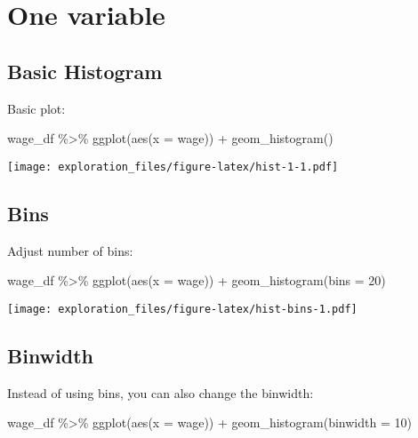 \documentclass[
]{book}
\newenvironment{Shaded}{\begin{snugshade}}{\end{snugshade}}
\newcommand{\AttributeTok}[1]{\textcolor[rgb]{0.77,0.63,0.00}{#1}}
\newcommand{\DecValTok}[1]{\textcolor[rgb]{0.00,0.00,0.81}{#1}}
\newcommand{\FunctionTok}[1]{\textcolor[rgb]{0.00,0.00,0.00}{#1}}
\newcommand{\NormalTok}[1]{#1}
\newcommand{\SpecialCharTok}[1]{\textcolor[rgb]{0.00,0.00,0.00}{#1}}
\begin{document}
\hypertarget{one-variable-1}{%
\section{One variable}\label{one-variable-1}}

\hypertarget{basic-histogram}{%
\subsection{Basic Histogram}\label{basic-histogram}}

Basic plot:

\begin{Shaded}
\begin{Highlighting}[]
\NormalTok{wage\_df }\SpecialCharTok{\%\textgreater{}\%} 
  \FunctionTok{ggplot}\NormalTok{(}\FunctionTok{aes}\NormalTok{(}\AttributeTok{x =}\NormalTok{ wage)) }\SpecialCharTok{+}
  \FunctionTok{geom\_histogram}\NormalTok{()}
\end{Highlighting}
\end{Shaded}

\texttt{[image: exploration\_files/figure-latex/hist-1-1.pdf]}

\hypertarget{bins}{%
\subsection{Bins}\label{bins}}

Adjust number of bins:

\begin{Shaded}
\begin{Highlighting}[]
\NormalTok{wage\_df }\SpecialCharTok{\%\textgreater{}\%} 
  \FunctionTok{ggplot}\NormalTok{(}\FunctionTok{aes}\NormalTok{(}\AttributeTok{x =}\NormalTok{ wage)) }\SpecialCharTok{+}
  \FunctionTok{geom\_histogram}\NormalTok{(}\AttributeTok{bins =} \DecValTok{20}\NormalTok{)}
\end{Highlighting}
\end{Shaded}

\texttt{[image: exploration\_files/figure-latex/hist-bins-1.pdf]}

\hypertarget{binwidth}{%
\subsection{Binwidth}\label{binwidth}}

Instead of using bins, you can also change the binwidth:

\begin{Shaded}
\begin{Highlighting}[]
\NormalTok{wage\_df }\SpecialCharTok{\%\textgreater{}\%} 
  \FunctionTok{ggplot}\NormalTok{(}\FunctionTok{aes}\NormalTok{(}\AttributeTok{x =}\NormalTok{ wage)) }\SpecialCharTok{+}
  \FunctionTok{geom\_histogram}\NormalTok{(}\AttributeTok{binwidth =} \DecValTok{10}\NormalTok{)}
\end{Highlighting}
\end{Shaded}
\end{document}
